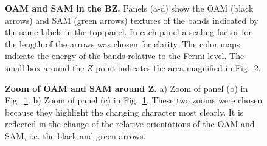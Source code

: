 
\begin{figure}
	\centering
  \caption{\label{fig:Rashba_textures}{\bf OAM and SAM in the BZ.} Panels (a-d) show the OAM (black arrows) and SAM (green arrows) textures of the bands indicated by the same labels in the top panel. In each panel a scaling factor for the length of the arrows was chosen for clarity. The color maps indicate the energy of the bands relative to the Fermi level. The small box around the $Z$ point indicates the area magnified in Fig.~\ref{fig:Rashba_textures_small}.}
\end{figure}
\begin{figure}
	\centering
  \caption{\label{fig:Rashba_textures_small}{\bf Zoom of OAM and SAM around Z.} a) Zoom of panel (b) in Fig.~\ref{fig:Rashba_textures}. b) Zoom of panel (c) in Fig.~\ref{fig:Rashba_textures}.  These two zooms were chosen because they highlight the changing character most clearly. It is reflected in the change of the relative orientations of the OAM and SAM, i.e. the black and green arrows.}
\end{figure}

